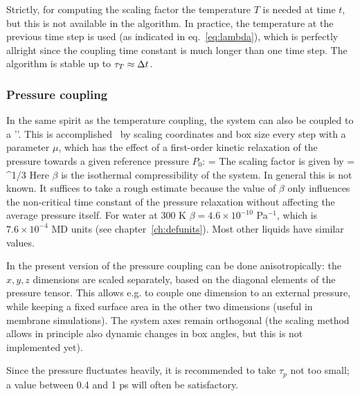 Strictly,  for computing the scaling factor the temperature $T$ is
needed at time $t$, but this is not available in the algorithm. In
practice, the temperature at the previous time step is used (as
indicated in eq.~\ref{eq:lambda}), which is
perfectly allright since the coupling time constant is much longer
than one time step. The algorithm is stable up to $\tau_T \approx {\Delta t}$.

\subsubsection*{Pressure coupling}
In the same spirit as the temperature coupling, the system can also be
coupled to a ''. 
This is accomplished~\cite{Berendsen84} by scaling
coordinates and box size every step with a parameter $\mu$, which has
the effect of a first-order kinetic relaxation of the pressure towards
a given reference pressure $P_0$:
\beq
{} = 
\eeq
The scaling factor is given by
\beq
\mu = ^{1/3}
\label{eq:mu}
\eeq
Here $\beta$ is the isothermal compressibility of the system. In general
this is not known. It suffices to take a rough estimate because the
value of $\beta$ only influences the non-critical time constant of the
pressure relaxation without affecting the average pressure itself. For
water at 300 K $\beta = 4.6 \times 10^{-10}$ Pa$^{-1}$, which is $7.6
\times 10^{-4}$ MD units (see chapter~\ref{ch:defunits}). Most other
liquids have similar values.

In the present version of \gromacs the pressure coupling can be done
anisotropically: the $x,y,z$ dimensions are scaled separately, based
on the diagonal elements of the pressure tensor. This allows e.g.  to couple
one dimension to an external pressure, while keeping a fixed surface
area in the other two dimensions (useful in membrane simulations). The
system  axes remain orthogonal (the scaling method allows in principle
also  dynamic changes in box angles, but this is not implemented yet).

Since the pressure fluctuates heavily, it is recommended to take
$\tau_p$ not too small; a value between 0.4 and 1 ps will often be
satisfactory.

